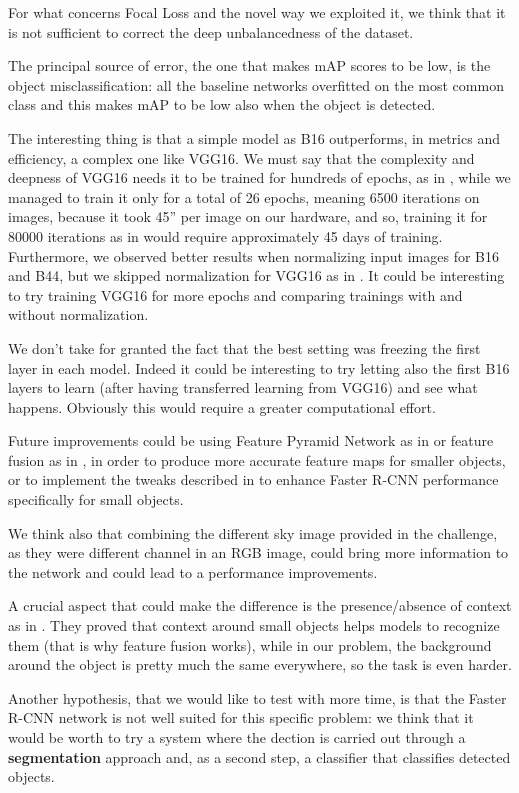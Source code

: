 \documentclass[a4paper,10pt]{report}
\begin{document}
For what concerns Focal Loss and the novel way we exploited it, we think that it is not sufficient to correct the deep unbalancedness of the dataset.

The principal source of error, the one that makes mAP scores to be low, is the object misclassification: all the baseline networks overfitted on the most common class and this makes mAP to be low also when the object is detected.

The interesting thing is that a simple model as B16 outperforms, in metrics and efficiency, a complex one like VGG16.
We must say that the complexity and deepness of VGG16 needs it to be trained for hundreds of epochs, as in \cite{claran}, while we managed to train it only for a total of 26 epochs, meaning 6500 iterations on images, because it took 45'' per image on our hardware, and so, training it for 80000 iterations as in \cite{claran} would require approximately 45 days of training.
Furthermore, we observed better results when normalizing input images for B16 and B44, but we skipped normalization for VGG16 as in \cite{vgg}.
It could be interesting to try training VGG16 for more epochs and comparing trainings with and without normalization.

We don't take for granted the fact that the best setting was freezing the first layer in each model. 
Indeed it could be interesting to try letting also the first B16 layers to learn (after having transferred learning from VGG16) and see what happens. Obviously this would require a greater computational effort.

Future improvements could be using Feature Pyramid Network as in \cite{fpn} or feature fusion as in \cite{small-obj-detection-in-optical-remote-sensing}, in order to produce more accurate feature maps for smaller objects, or to implement the tweaks described in \cite{frcnn-small-obj} to enhance Faster R-CNN performance specifically for small objects.

We think also that combining the different sky image provided in the challenge, as they were different channel in an RGB image, could bring more information to the network and could lead to a performance improvements.

A crucial aspect that could make the difference is the presence/absence of context as in \cite{small-obj-detection-in-optical-remote-sensing}. 
They proved that context around small objects helps models to recognize them (that is why feature fusion works), while in our problem, the background around the object is pretty much the same everywhere, so the task is even harder.

Another hypothesis, that we would like to test with more time, is that the Faster R-CNN network is not well suited for this specific problem: we think that it would be worth to try a system where the dection is carried out through a \textbf{segmentation} approach and, as a second step, a classifier that classifies detected objects.

\printbibliography
\end{document}
